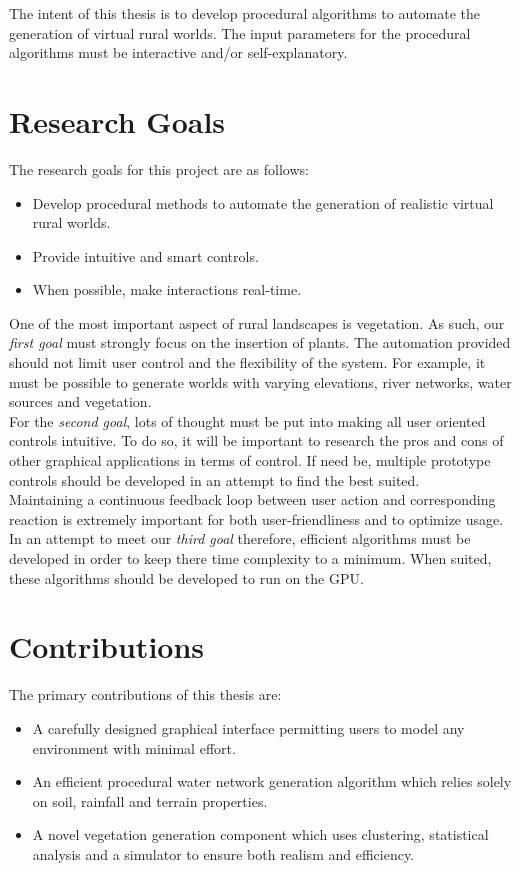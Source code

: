 The intent of this thesis is to develop procedural algorithms to automate the generation of virtual rural worlds. The input parameters for the procedural algorithms must be interactive and/or self-explanatory. 

\newpage
\section{Research Goals}

The research goals for this project are as follows:
\begin{itemize}
\item Develop procedural methods to automate the generation of realistic virtual rural worlds.
\item Provide intuitive and smart controls.
\item When possible, make interactions real-time.
\end{itemize}

One of the most important aspect of rural landscapes is vegetation. As such, our \textit{first goal} must strongly focus on the insertion of plants. The automation provided should not limit user control and the flexibility of the system. For example, it must be possible to generate worlds with varying elevations, river networks, water sources and vegetation.\\

For the \textit{second goal}, lots of thought must be put into making all user oriented controls intuitive. To do so, it will be important to research the pros and cons of other graphical applications in terms of control. If need be, multiple prototype controls should be developed in an attempt to find the best suited.\\

Maintaining a continuous feedback loop between user action and corresponding reaction is extremely important for both user-friendliness and to optimize usage. In an attempt to meet our \textit{third goal} therefore, efficient algorithms must be developed in order to keep there time complexity to a minimum. When suited, these algorithms should be developed to run on the GPU. \\

\section{Contributions}

The primary contributions of this thesis are:
\begin{itemize}
\item A carefully designed graphical interface permitting users to model any environment with minimal effort.
\item An efficient procedural water network generation algorithm which relies solely on soil, rainfall and terrain properties.
\item A novel vegetation generation component which uses clustering, statistical analysis and a simulator to ensure both realism and efficiency.
\end{itemize}


